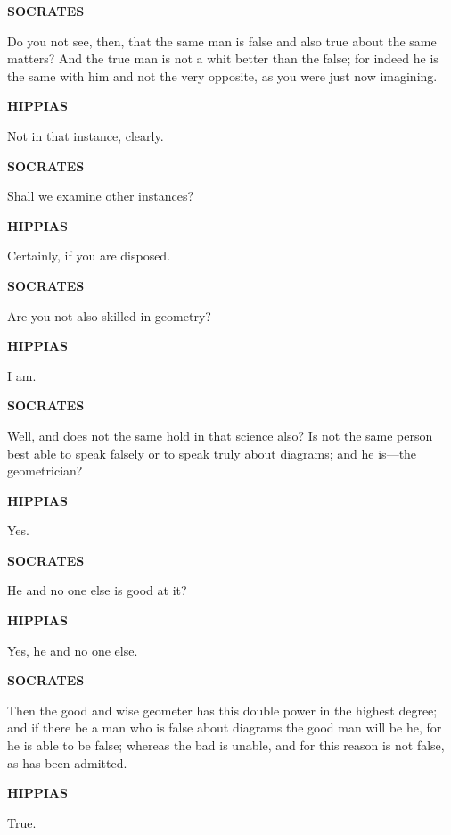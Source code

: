 \documentclass[11pt,letter]{article}
\begin{document}
\par \textbf{SOCRATES}
\par   Do you not see, then, that the same man is false and also true about the same matters? And the true man is not a whit better than the false; for indeed he is the same with him and not the very opposite, as you were just now imagining.

\par \textbf{HIPPIAS}
\par   Not in that instance, clearly.

\par \textbf{SOCRATES}
\par   Shall we examine other instances?

\par \textbf{HIPPIAS}
\par   Certainly, if you are disposed.

\par \textbf{SOCRATES}
\par   Are you not also skilled in geometry?

\par \textbf{HIPPIAS}
\par   I am.

\par \textbf{SOCRATES}
\par   Well, and does not the same hold in that science also? Is not the same person best able to speak falsely or to speak truly about diagrams; and he is—the geometrician?

\par \textbf{HIPPIAS}
\par   Yes.

\par \textbf{SOCRATES}
\par   He and no one else is good at it?

\par \textbf{HIPPIAS}
\par   Yes, he and no one else.

\par \textbf{SOCRATES}
\par   Then the good and wise geometer has this double power in the highest degree; and if there be a man who is false about diagrams the good man will be he, for he is able to be false; whereas the bad is unable, and for this reason is not false, as has been admitted.

\par \textbf{HIPPIAS}
\par   True.
\end{document}
